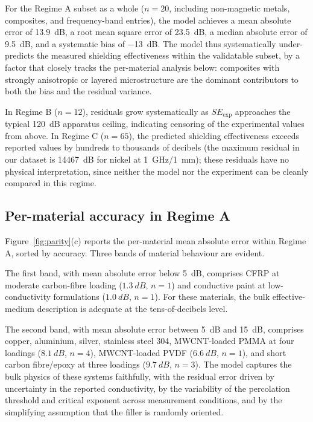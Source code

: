\documentclass[review,3p,authoryear]{elsarticle}
\begin{document}
For the Regime A subset as a whole ($n = \num{20}$, including non-magnetic metals, composites, and frequency-band entries), the model achieves a mean absolute error of \SI{13.9}{dB}, a root mean square error of \SI{23.5}{dB}, a median absolute error of \SI{9.5}{dB}, and a systematic bias of \SI{-13}{dB}. The model thus systematically under-predicts the measured shielding effectiveness within the validatable subset, by a factor that closely tracks the per-material analysis below: composites with strongly anisotropic or layered microstructure are the dominant contributors to both the bias and the residual variance.

In Regime B ($n = 12$), residuals grow systematically as $SE_{\mathrm{exp}}$ approaches the typical \SI{120}{dB} apparatus ceiling, indicating censoring of the experimental values from above. In Regime C ($n = 65$), the predicted shielding effectiveness exceeds reported values by hundreds to thousands of decibels (the maximum residual in our dataset is \SI{14467}{dB} for nickel at \SI{1}{GHz}/\SI{1}{mm}); these residuals have no physical interpretation, since neither the model nor the experiment can be cleanly compared in this regime.

\subsection{Per-material accuracy in Regime A}

Figure~\ref{fig:parity}(c) reports the per-material mean absolute error within Regime A, sorted by accuracy. Three bands of material behaviour are evident.

The first band, with mean absolute error below \SI{5}{dB}, comprises CFRP at moderate carbon-fibre loading ($\SI{1.3}{dB}$, $n = 1$) and conductive paint at low-conductivity formulations ($\SI{1.0}{dB}$, $n = 1$). For these materials, the bulk effective-medium description is adequate at the tens-of-decibels level.

The second band, with mean absolute error between \SI{5}{dB} and \SI{15}{dB}, comprises copper, aluminium, silver, stainless steel \num{304}, MWCNT-loaded PMMA at four loadings ($\SI{8.1}{dB}$, $n = 4$), MWCNT-loaded PVDF ($\SI{6.6}{dB}$, $n = 1$), and short carbon fibre/epoxy at three loadings ($\SI{9.7}{dB}$, $n = 3$). The model captures the bulk physics of these systems faithfully, with the residual error driven by uncertainty in the reported conductivity, by the variability of the percolation threshold and critical exponent across measurement conditions, and by the simplifying assumption that the filler is randomly oriented.
\end{document}
